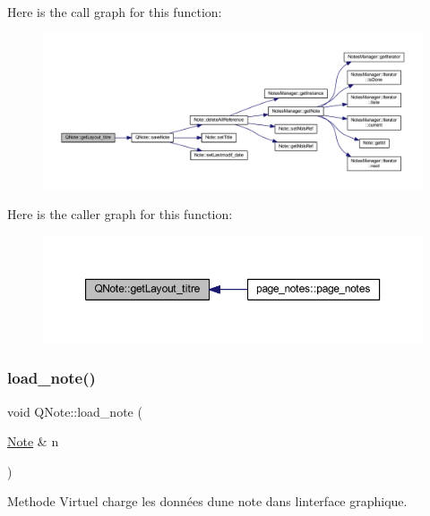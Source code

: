 Here is the call graph for this function\+:\nopagebreak
\begin{figure}[H]
\begin{center}
\leavevmode
\includegraphics[width=350pt]{class_q_note_a7cfd446c3cf5a52caa7b07aa1ccb42f8_cgraph}
\end{center}
\end{figure}
Here is the caller graph for this function\+:\nopagebreak
\begin{figure}[H]
\begin{center}
\leavevmode
\includegraphics[width=350pt]{class_q_note_a7cfd446c3cf5a52caa7b07aa1ccb42f8_icgraph}
\end{center}
\end{figure}
\mbox{\label{class_q_note_adca0a8f2851fbb1c3843ca4fe7957c11}} 
\subsubsection{\texorpdfstring{load\+\_\+note()}{load\_note()}}
{\footnotesize\ttfamily void Q\+Note\+::load\+\_\+note (\begin{DoxyParamCaption}\item[{\hyperlink{class_note}{Note} \&}]{n }\end{DoxyParamCaption})\hspace{0.3cm}{\ttfamily [virtual]}}



Methode Virtuel charge les données d\textquotesingle{}une note dans l\textquotesingle{}interface graphique. 


